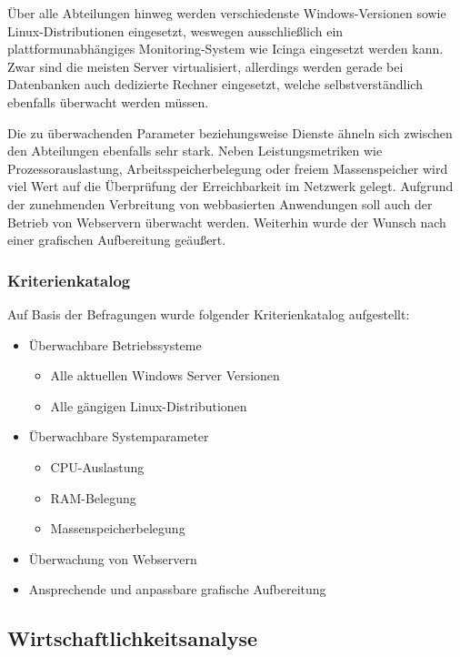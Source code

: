 Über alle Abteilungen hinweg werden verschiedenste Windows-Versionen sowie Linux-Distributionen eingesetzt, weswegen ausschließlich ein plattformunabhängiges Monitoring-System wie \glqq Icinga\grqq{} eingesetzt werden kann. Zwar sind die meisten Server virtualisiert, allerdings werden gerade bei Datenbanken auch dedizierte Rechner eingesetzt, welche selbstverständlich ebenfalls überwacht werden müssen.

Die zu überwachenden Parameter beziehungsweise Dienste ähneln sich zwischen den Abteilungen ebenfalls sehr stark. Neben Leistungsmetriken wie Prozessorauslastung, Arbeitsspeicherbelegung oder freiem Massenspeicher wird viel Wert auf die Überprüfung der Erreichbarkeit im Netzwerk gelegt. Aufgrund der zunehmenden Verbreitung von webbasierten Anwendungen soll auch der Betrieb von Webservern überwacht werden. Weiterhin wurde der Wunsch nach einer grafischen Aufbereitung geäußert.

\subsubsection{Kriterienkatalog}
\label{sec:Kriterienkatalog}
Auf Basis der Befragungen wurde folgender Kriterienkatalog aufgestellt:
\begin{itemize}
	\item Überwachbare Betriebssysteme
	\begin{itemize}
		\item Alle aktuellen Windows Server Versionen
		\item Alle gängigen Linux-Distributionen
	\end{itemize}
	\item Überwachbare Systemparameter
	\begin{itemize}
		\item CPU-Auslastung
		\item RAM-Belegung
		\item Massenspeicherbelegung
	\end{itemize}
	\item Überwachung von Webservern
	\item Ansprechende und anpassbare grafische Aufbereitung
\end{itemize}

\subsection{Wirtschaftlichkeitsanalyse}
\label{sec:Wirtschaftlichkeitsanalyse}

